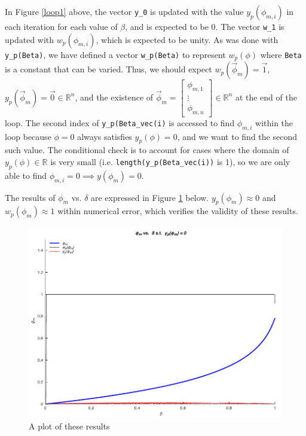 In Figure \ref{loop1} above, the vector \verb|y_0| is updated with the value $y_p(\phi_{m,i})$ in each iteration
for each value of $\beta$, and is expected to be 0. The vector \verb|w_1| is updated with $w_p(\phi_{m,i})$, which is expected to be unity. As was done with \verb|y_p(Beta)|, 
we have defined a vector \verb|w_p(Beta)| to represent $w_p(\phi)$ where \verb|Beta| is a constant that can be varied.
Thus, we should expect $w_p(\vec\phi_m)=\vec{1}$, $y_p(\vec\phi_m)=\vec{0}\in \mathbb{R}^n$, and the existence of $\vec\phi_m=\begin{bmatrix}\phi_{m,1}\\\vdots\\\phi_{m,n}\end{bmatrix}\in \mathbb{R}^n$ at the end of the loop.
The second index of \verb|y_p(Beta_vec(i)| is accessed to find $\phi_{m,i}$ within the loop because $\phi=0$ always satisfies $y_p(\phi)=0$, and we want to find the second such value.
The conditional check is to account for cases where the domain of $y_p(\phi)\in \mathbb{R}$ is very small (i.e. \verb|length(y_p(Beta_vec(i))| is 1), so we are only able to find $\phi_{m,i}=0\implies y(\phi_m)=0$.

The results of $\phi_m$ vs. $\delta$ are expressed in Figure \ref{yminplot} below. $y_p(\phi_m)\approx 0$ and $w_p(\phi_m)\approx 1$ within numerical error, which verifies the validity of these results.

\begin{figure}[H]
    \centering
    \includegraphics{plots/phi_delta_y.pdf}
    \caption{A plot of these results}\label{yminplot}
\end{figure}

